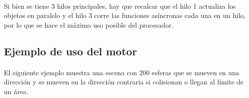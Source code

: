 \documentclass{standalone}
\begin{document}
\paragraph{}
Si bien se tiene 3 hilos principales, hay que recalcar que el hilo 1 actualiza los objetos en paralelo y el hilo 3 corre las funciones asíncronas cada una en un hilo, por lo que se hace el máximo uso posible del procesador.

\subsection{Ejemplo de uso del motor}

\paragraph{}
El siguiente ejemplo muestra una escena con 200 esferas que se mueven en una dirección y se mueven en la dirección contraria si colisionan o llegan al límite de un área.
\end{document}
